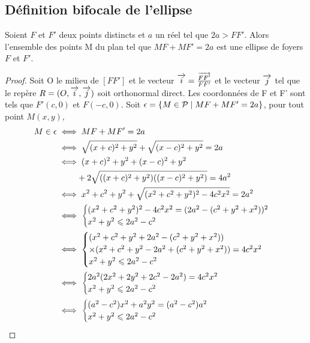\subsection{Définition bifocale de l'ellipse}
\begin{prop}
  \label{prop:bifellipse}
  Soient \(F\) et \(F'\) deux points distincts et \(a\) un réel tel que \(2a>FF'\). Alors l'ensemble des points M du plan tel que \(MF+MF'=2a\) est une ellipse de foyers \(F\) et \(F'\).
\end{prop}
\begin{proof}
  Soit O le milieu de \([FF']\) et le vecteur \(\overrightarrow{i}=\frac{\overrightarrow{FF'}}{FF'}\) et le vecteur \(\overrightarrow{j}\) tel que le repère \(R=(O,\overrightarrow{i},\overrightarrow{j})\) soit orthonormal direct. Les coordonnées de F et F' sont tels que \(F'(c,0)\) et \(F(-c,0)\). Soit \(\epsilon=\left\{M \in \mathcal{P}\mathrel{}\middle|\mathrel{}MF+MF'=2a\right\}\), pour tout point \(M(x,y)\),
  \begin{align}
    M \in \epsilon & \iff MF+MF'=2a \\
    & \iff \sqrt{(x+c)^2+y^2} + \sqrt{(x-c)^2+y^2}=2a \\
    & \iff (x+c)^2+y^2+(x-c)^2+y^2 \notag \\
    & \phantom{\iff} + 2\sqrt{((x+c)^2+y^2)((x-c)^2+y^2)}=4a^2 \label{eq:tag:1}\\
    & \iff x^2+c^2+y^2+\sqrt{(x^2+c^2+y^2)^2-4c^2x^2}=2a^2\\
    & \iff \begin{cases} (x^2+c^2+y^2)^2-4c^2x^2 = (2a^2-(c^2+y^2+x^2))^2 \\ x^2+y^2 \leqslant 2a^2 -c^2\\\end{cases}\\
    & \iff \begin{cases} (x^2+c^2+y^2 + 2a^2-(c^2+y^2+x^2)) \\ \times (x^2+c^2+y^2 - 2a^2+(c^2+y^2+x^2))=4c^2x^2  \\ x^2+y^2 \leqslant 2a^2 -c^2\end{cases}\\
    & \iff \begin{cases} 2a^2(2x^2+2y^2+2c^2-2a^2)=4c^2x^2  \\ x^2+y^2 \leqslant 2a^2 -c^2\end{cases}\\
    & \iff \begin{cases} (a^2-c^2)x^2 +a^2y^2=(a^2-c^2)a^2  \\ x^2+y^2 \leqslant 2a^2 -c^2\end{cases}
  \end{align}

\end{proof}
